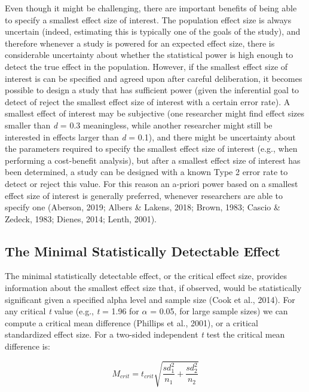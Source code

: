 \documentclass[
  english,
  ,jou, a4paper,floatsintext]{apa6}
\begin{document}
Even though it might be challenging, there are important benefits of being able to specify a smallest effect size of interest. The population effect size is always uncertain (indeed, estimating this is typically one of the goals of the study), and therefore whenever a study is powered for an expected effect size, there is considerable uncertainty about whether the statistical power is high enough to detect the true effect in the population. However, if the smallest effect size of interest is can be specified and agreed upon after careful deliberation, it becomes possible to design a study that has sufficient power (given the inferential goal to detect of reject the smallest effect size of interest with a certain error rate). A smallest effect of interest may be subjective (one researcher might find effect sizes smaller than \emph{d} = 0.3 meaningless, while another researcher might still be interested in effects larger than \emph{d} = 0.1), and there might be uncertainty about the parameters required to specify the smallest effect size of interest (e.g., when performing a cost-benefit analysis), but after a smallest effect size of interest has been determined, a study can be designed with a known Type 2 error rate to detect or reject this value. For this reason an a-priori power based on a smallest effect size of interest is generally preferred, whenever researchers are able to specify one (Aberson, 2019; Albers \& Lakens, 2018; Brown, 1983; Cascio \& Zedeck, 1983; Dienes, 2014; Lenth, 2001).

\hypertarget{the-minimal-statistically-detectable-effect}{%
\subsection{The Minimal Statistically Detectable Effect}\label{the-minimal-statistically-detectable-effect}}

The minimal statistically detectable effect, or the critical effect size, provides information about the smallest effect size that, if observed, would be statistically significant given a specified alpha level and sample size (Cook et al., 2014). For any critical \emph{t} value (e.g., \emph{t} = 1.96 for \(\alpha\) = 0.05, for large sample sizes) we can compute a critical mean difference (Phillips et al., 2001), or a critical standardized effect size. For a two-sided independent \emph{t} test the critical mean difference is:

\[M_{crit} = t_{crit}{\sqrt{\frac{sd_1^2}{n_1} + \frac{sd_2^2}{n_2}}}\]
\end{document}
